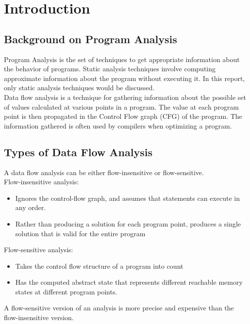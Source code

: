 \chapter{Introduction}

\section{Background on Program Analysis}

Program Analysis is the set of techniques to get appropriate information about the behavior of programs. Static analysis techniques involve computing approximate information about the program without executing it. In this report, only static analysis techniques would be discussed.  \\ 


Data flow analysis is a technique for gathering information about the possible set of values calculated at various points in a program. The value at each program point is then propagated in the Control Flow graph (CFG) of the program.  The information gathered is often used by compilers when optimizing a program. 

\section{Types of Data Flow Analysis}

A data flow analysis can be either flow-insensitive or flow-sensitive. \\ 

Flow-insensitive analysis:
\begin{itemize}
	\item Ignores the control-flow graph, and assumes that statements can execute in any order.
	\item Rather than producing a solution for each program point, produces a single solution that is valid for the entire program
\end{itemize}
 
Flow-sensitive analysis:
\begin{itemize}
	\item Takes the control
	flow structure of a program into count
	\item Has the computed abstract state that represents different reachable memory states at different program points.
\end{itemize}

A flow-sensitive version of
an analysis is more precise and expensive than the flow-insensitive version. \\

